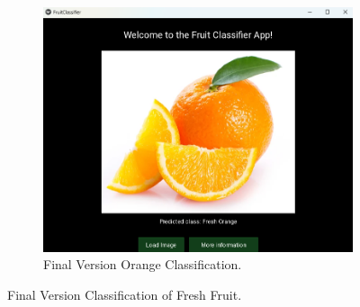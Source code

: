 \documentclass[conference]{IEEEtran}
\begin{document}
\begin{figure}[h]
\begin{subfigure}[b]{0.48\linewidth}
        \includegraphics[width=\linewidth]{Mlayer orage3.png}
        \caption{Final Version Orange Classification.}
        \label{figFB}
    \end{subfigure}
    \caption{Final Version Classification of Fresh Fruit.}
    \label{FigMF}
\end{figure}
\end{document}
